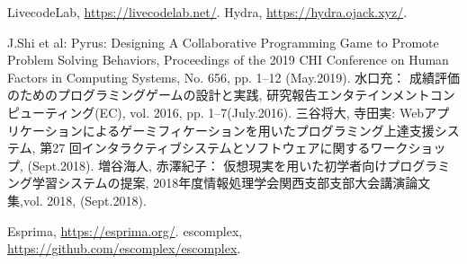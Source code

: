 \begin{thebibliography}{99}
	LivecodeLab, \url{https://livecodelab.net/}.
	Hydra, \url{https://hydra.ojack.xyz/}.

	J.Shi et al: Pyrus: Designing A Collaborative Programming Game to Promote Problem Solving Behaviors, Proceedings of the 2019 CHI Conference on Human Factors in Computing Systems, No. 656, pp. 1–12 (May.2019).
	水口充： 成績評価のためのプログラミングゲームの設計と実践, 研究報告エンタテインメントコンピューティング(EC), vol. 2016, pp. 1–7(July.2016).
	三谷将大, 寺田実: Webアプリケーションによるゲーミフィケーションを用いたプログラミング上達支援システム, 第27 回インタラクティブシステムとソフトウェアに関するワークショップ, (Sept.2018).
	増谷海人, 赤澤紀子： 仮想現実を用いた初学者向けプログラミング学習システムの提案, 2018年度情報処理学会関西支部支部大会講演論文集,vol. 2018, (Sept.2018).

	Esprima, \url{https://esprima.org/}.
	escomplex, \url{https://github.com/escomplex/escomplex}.

\end{thebibliography}